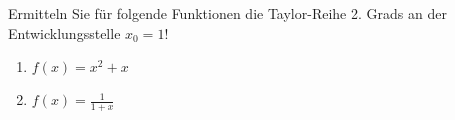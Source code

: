 \item Ermitteln Sie für folgende Funktionen die Taylor-Reihe 2. Grads an der Entwicklungsstelle $x_0=1$!

\begin{multicols}{2}
\begin{enumerate}
\item $f(x) = x^2+x$
\item $f(x) = \frac{1}{1+x}$ 
\end{enumerate}
\end{multicols}

